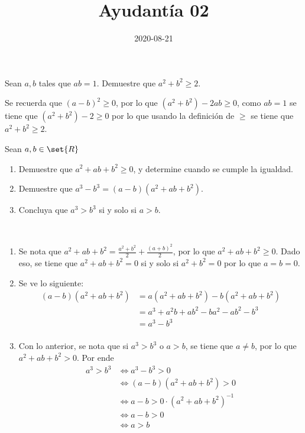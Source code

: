 \documentclass{ayudantia}
\title{Ayudantía 02}
\date{2020-08-21}
\begin{document}
\maketitle

\begin{prob}
    Sean \(a,b\) tales que \(ab=1\). Demuestre que \(a^2+b^2\geq2\).
\end{prob}

\begin{ans}
    \begin{sol}
        Se recuerda que \((a-b)^2\geq0\), por lo que \((a^2+b^2)-2ab\geq0\), como \(ab=1\) se tiene que \((a^2+b^2)-2\geq0\) por lo que usando la definición de \(\geq\) se tiene que \(a^2+b^2\geq2\).
    \end{sol}
\end{ans}


\begin{prob}
    Sean \(a,b\in\set{R}\)
    \begin{enumerate}
        \item Demuestre que \(a^2+ab+b^2\geq0\), y determine cuando se cumple la igualdad.
        \item Demuestre que \(a^3-b^3=(a-b)(a^2+ab+b^2)\).
        \item Concluya que \(a^3>b^3\) si y solo si \(a>b\).
    \end{enumerate}\
\end{prob}

\begin{ans}
    \begin{sol}
        \begin{enumerate}
            \item Se nota que \(a^2+ab+b^2=\frac{a^2+b^2}2+\frac{(a+b)^2}2\), por lo que \(a^2+ab+b^2\geq0\). Dado eso, se tiene que \(a^2+ab+b^2=0\) si y solo si \(a^2+b^2=0\) por lo que \(a=b=0\).
            \item Se ve lo siguiente:
            \begin{align*}
                (a-b)(a^2+ab+b^2)&=a(a^2+ab+b^2)-b(a^2+ab+b^2)\\
                &=a^3+a^2b+ab^2-ba^2-ab^2-b^3\\
                &=a^3-b^3\\
            \end{align*}
            \item Con lo anterior, se nota que si \(a^3>b^3\) o \(a>b\), se tiene que \(a\neq b\), por lo que \(a^2+ab+b^2>0\). Por ende
            \begin{align*}
                a^3>b^3&\iff a^3-b^3>0\\
                &\iff (a-b)(a^2+ab+b^2)>0\\
                &\iff a-b>0\cdot(a^2+ab+b^2)^{-1}\\
                &\iff a-b>0\\
                &\iff a>b\\
            \end{align*}
        \end{enumerate}
    \end{sol}
\end{ans}
\end{document}
